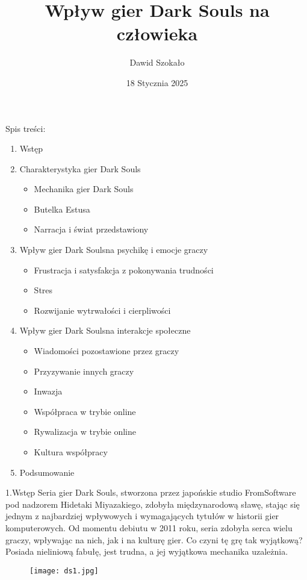 \documentclass{beamer}
\title{Wpływ gier Dark Souls na człowieka}  %
\author{Dawid Szokało}
\date{18 Stycznia 2025}
\begin{document}
\begin{frame}
    \titlepage
\end{frame}

\begin{frame}{Spis treści:}  %

\begin{enumerate}
 \item Wstęp
    \item Charakterystyka gier \glqq Dark Souls\grqq
        \begin{itemize}
      \item Mechanika gier Dark Souls
      \item Butelka Estusa
       \item Narracja i świat przedstawiony
        \end{itemize}

    \item Wpływ gier \glqq Dark Souls\grqq na psychikę i emocje graczy
      \begin{itemize}
      \item Frustracja i satysfakcja z pokonywania trudności
      \item Stres
       \item Rozwijanie wytrwałości i cierpliwości
        \end{itemize}

    \item Wpływ gier \glqq Dark Souls\grqq na interakcje społeczne
     \begin{itemize}
      \item Wiadomości pozostawione przez graczy
      \item Przyzywanie innych graczy
       \item Inwazja
       \item Współpraca w trybie online
       \item Rywalizacja w trybie online
       \item Kultura współpracy
        \end{itemize}

    \item Podsumowanie
\end{enumerate}
\end{frame}

\begin{frame}{1.Wstęp}  %
\small Seria gier Dark Souls, stworzona przez japońskie studio FromSoftware pod nadzorem Hidetaki Miyazakiego, zdobyła międzynarodową sławę, stając się jednym z najbardziej wpływowych i wymagających tytułów w historii gier komputerowych. Od momentu debiutu w 2011 roku, seria  zdobyła serca wielu graczy,  wpływając na nich, jak i na  kulturę gier. Co czyni tę grę  tak wyjątkową? Posiada nieliniową fabułę, jest trudna, a jej wyjątkowa mechanika uzależnia.
 \begin{figure}
    \centering
        \texttt{[image: ds1.jpg]}
 
    \end{figure}

\end{frame}
\end{document}
